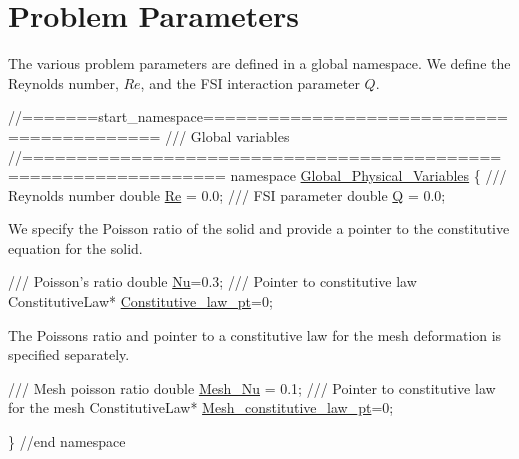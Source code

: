 \hypertarget{index_namespace}{}\section{Problem Parameters}\label{index_namespace}
The various problem parameters are defined in a global namespace. We define the Reynolds number, $ Re $, and the F\+SI interaction parameter $ Q $.

 
\begin{DoxyCodeInclude}
\textcolor{comment}{//=======start\_namespace==========================================}
\textcolor{comment}{/// Global variables}
\textcolor{comment}{}\textcolor{comment}{//================================================================}
\textcolor{keyword}{namespace }\hyperlink{namespaceGlobal__Physical__Variables}{Global\_Physical\_Variables}
\{\textcolor{comment}{}
\textcolor{comment}{ /// Reynolds number}
\textcolor{comment}{} \textcolor{keywordtype}{double} \hyperlink{namespaceGlobal__Physical__Variables_ab814e627d2eb5bc50318879d19ab16b9}{Re} = 0.0;
\textcolor{comment}{}
\textcolor{comment}{ /// FSI parameter}
\textcolor{comment}{} \textcolor{keywordtype}{double} \hyperlink{namespaceGlobal__Physical__Variables_a66cb7ecda9ba0cd72367dd697f154545}{Q} = 0.0;

\end{DoxyCodeInclude}


We specify the Poisson ratio of the solid and provide a pointer to the constitutive equation for the solid.


\begin{DoxyCodeInclude}
\textcolor{comment}{}
\textcolor{comment}{ /// Poisson's ratio}
\textcolor{comment}{} \textcolor{keywordtype}{double} \hyperlink{namespaceGlobal__Physical__Variables_a3962c36313826b19f216f6bbbdd6a477}{Nu}=0.3;
\textcolor{comment}{}
\textcolor{comment}{ /// Pointer to constitutive law}
\textcolor{comment}{} ConstitutiveLaw* \hyperlink{namespaceGlobal__Physical__Variables_a2a37fb040c832ee7a086bb13bb02a100}{Constitutive\_law\_pt}=0;

\end{DoxyCodeInclude}


The Poisson\textquotesingle{}s ratio and pointer to a constitutive law for the mesh deformation is specified separately.


\begin{DoxyCodeInclude}
 \textcolor{comment}{}
\textcolor{comment}{ /// Mesh poisson ratio}
\textcolor{comment}{} \textcolor{keywordtype}{double} \hyperlink{namespaceGlobal__Physical__Variables_a0f1535b448627cbfa0acfb742120d96f}{Mesh\_Nu} = 0.1;
\textcolor{comment}{}
\textcolor{comment}{ /// Pointer to constitutive law for the mesh}
\textcolor{comment}{} ConstitutiveLaw* \hyperlink{namespaceGlobal__Physical__Variables_aac1b52d0b82bc48d24dfcb031d9dc25f}{Mesh\_constitutive\_law\_pt}=0;

\} \textcolor{comment}{//end namespace}

\end{DoxyCodeInclude}




